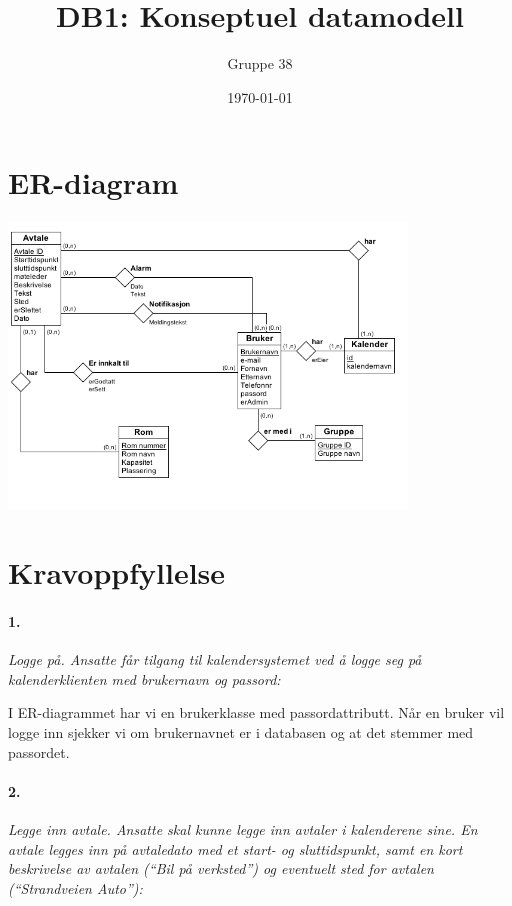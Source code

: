 \documentclass[titlepage]{article}
\author{Gruppe 38}
\title{DB1: Konseptuel datamodell}
\date{\today}
\begin{document}
\maketitle

\tableofcontents

\newpage


\section{ER-diagram}
\includegraphics[width=400px]{ERdiagram.png}

\newpage

\section{Kravoppfyllelse}
\paragraph{1.}\textit{ Logge på. Ansatte får tilgang til kalendersystemet ved å logge seg på kalenderklienten med brukernavn og passord:}

I ER-diagrammet har vi en brukerklasse med passordattributt. Når en bruker vil logge inn sjekker vi om brukernavnet er i databasen og at det stemmer med passordet.

\paragraph{2.}\textit{ Legge inn avtale. Ansatte skal kunne legge inn avtaler i kalenderene sine. En avtale
legges inn på avtaledato med et start- og sluttidspunkt, samt en kort beskrivelse av
avtalen (``Bil på verksted'') og eventuelt sted for avtalen (``Strandveien Auto''):}
\end{document}

